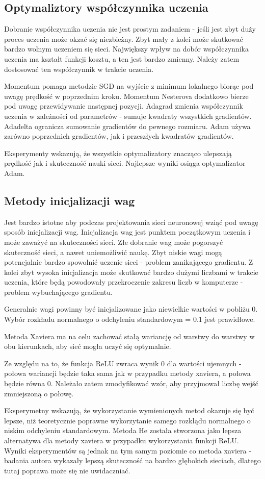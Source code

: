 \documentclass{article}
\begin{document}
\subsection{Optymaliztory współczynnika uczenia}

Dobranie współczynnika uczenia nie jest prostym zadaniem - jeśli jest zbyt duży proces uczenia może okzać się niezbieżny.
Zbyt mały z kolei może skutkować bardzo wolnym uczeniem się sieci. Największy wpływ na dobór współczynnika uczenia ma kształt funkcji kosztu,
a ten jest bardzo zmienny. Należy zatem dostosować ten współczynnik w trakcie uczenia.

Momentum pomaga metodzie SGD na wyjście z minimum lokalnego biorąc pod uwagę prędkość w poprzednim kroku.
Momentum Nesterova dodatkowo bierze pod uwagę przewidywanie następnej pozycji.
Adagrad zmienia współczynnik uczenia w zależności od parametrów - sumuje kwadraty wszystkich gradientów.
Adadelta ogranicza sumowanie gradientów do pewnego rozmiaru.
Adam używa zarówno poprzednich gradientów, jak i przeszłych kwadratów gradientów.

Eksperymenty wskazują, że wszystkie optymalizatory znacząco ulepszają prędkość jak i skuteczność nauki sieci. 
Najlepsze wyniki osiąga optymalizator Adam.


\subsection{Metody inicjalizacji wag}

Jest bardzo istotne aby podczas projektowania sieci neuronowej wziąć pod uwagę sposób inicjalizacji wag. Inicjalizacja wag jest
punktem początkowym uczenia i może zaważyć na skuteczności sieci. Złe dobranie wag może pogorszyć skuteczność sieci, a nawet uniemożliwić naukę.
Zbyt niskie wagi mogą potencjalnie bardzo spowolnić uczenie sieci - problem zanikającego gradientu. Z kolei zbyt wysoka inicjalizacja może
skutkować bardzo dużymi liczbami w trakcie uczenia, które będą powodowały przekroczenie zakresu liczb w komputerze - problem wybuchającego gradientu.

Generalnie wagi powinny być inicjalizowane jako niewielkie wartości w pobliżu 0. Wybór rozkładu normalnego o odchyleniu standardowym = 0.1 jest prawidłowe.

Metoda Xaviera ma na celu zachować stałą wariancję od warstwy do warstwy w obu kierunkach, aby sieć mogła uczyć się optymalnie.

Ze względu na to, że funkcja ReLU zwraca wynik 0 dla wartości ujemnych - połowa wariancji będzie taka sama jak w przypadku metody xaviera, a połowa będzie równa 0.
Należało zatem zmodyfikować wzór, aby przyjmował liczbę wejść zmniejszoną o połowę.

Eksperymetny wskazują, że wykorzystanie wymienionych metod okazuje się być lepsze, niż teoretycznie poprawne wykorzytanie samego rozkłądu normalnego o niskim odchyleniu standardowym.
Metoda He została stworzona jako lepsza alternatywa dla metody xaviera w przypadku wykorzystania funkcji ReLU.
Wyniki eksperymentów są jednak na tym samym poziomie co metoda xaviera - badania autora wykazały lepszą skuteczność na bardzo głębokich sieciach,
dlatego tutaj poprawa może się nie uwidaczniać.
\end{document}
